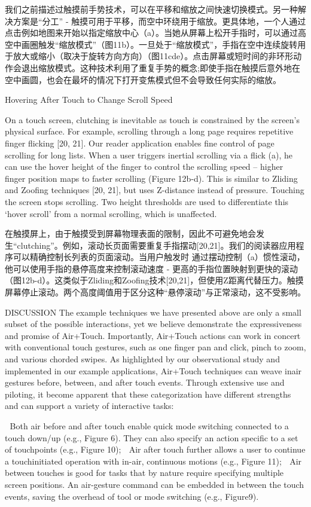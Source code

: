 我们之前描述过触摸前手势技术，可以在平移和缩放之间快速切换模式。另一种解决方案是“分工” - 触摸可用于平移，而空中环绕用于缩放。更具体地，一个人通过点击例如地图来开始以指定缩放中心（a）。当她从屏幕上松开手指时，可以通过高空中画圈触发“缩放模式”（图11b）。一旦处于“缩放模式”，手指在空中连续旋转用于放大或缩小（取决于旋转方向方向）（图11cde）。点击屏幕或短时间的非环形动作会退出缩放模式。这种技术利用了重复手势的概念;即使手指在触摸后意外地在空中画圆，也会在最坏的情况下打开变焦模式但不会导致任何实际的缩放。

Hovering After Touch to Change Scroll Speed

On a touch screen, clutching is inevitable as touch is constrained by the screen’s physical surface. For example, scrolling through a long page requires repetitive finger flicking [20, 21]. Our reader application enables fine control of page scrolling for long lists. When a user triggers
inertial scrolling via a flick (a), he can use the hover height of the finger to control the scrolling speed – higher finger position maps to faster scrolling (Figure 12b-d). This is similar to Zliding and Zoofing techniques [20, 21], but uses Z-distance instead of pressure. Touching the screen stops scrolling. Two height thresholds are used to differentiate this ‘hover scroll’ from a normal scrolling, which is unaffected. 

在触摸屏上，由于触摸受到屏幕物理表面的限制，因此不可避免地会发生“clutching”。例如，滚动长页面需要重复手指摆动[20,21]。我们的阅读器应用程序可以精确控制长列表的页面滚动。当用户触发时
通过摆动控制（a）惯性滚动，他可以使用手指的悬停高度来控制滚动速度 - 更高的手指位置映射到更快的滚动（图12b-d）。这类似于Zliding和Zoofing技术[20,21]，但使用Z距离代替压力。触摸屏幕停止滚动。两个高度阈值用于区分这种“悬停滚动”与正常滚动，这不受影响。

DISCUSSION
The example techniques we have presented above are only a small subset of the possible interactions, yet we believe demonstrate the expressiveness and promise of Air+Touch. Importantly, Air+Touch actions can work in concert with conventional touch gestures, such as one finger pan and
click, pinch to zoom, and various chorded swipes. As highlighted by our observational study and implemented in our example applications, Air+Touch techniques can weave inair gestures before, between, and after touch events. Through extensive use and piloting, it become apparent that
these categorization have different strengths and can support a variety of interactive tasks: 

 Both air before and after touch enable quick mode switching connected to a touch down/up (e.g., Figure 6). They can also specify an action specific to a set of touchpoints (e.g., Figure 10);
 Air after touch further allows a user to continue a touchinitiated operation with in-air, continuous motions (e.g., Figure 11);
 Air between touches is good for tasks that by nature require specifying multiple screen positions. An air-gesture command can be embedded in between the touch events, saving the overhead of tool or mode switching (e.g., Figure9). 

